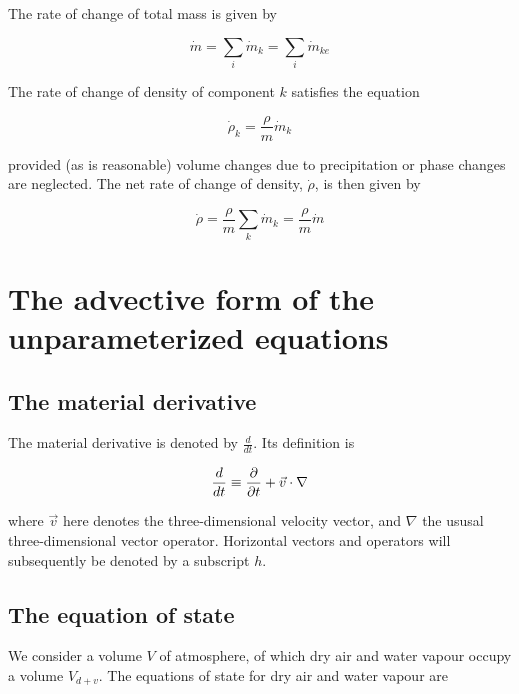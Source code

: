 The rate of change of total mass is given by

\begin{equation}
\label{A.1.5}\dot{m} = \sum_i  \dot{m}_k = \sum_i \dot{m}_{ke}
\end{equation}

The rate of change of density of component $k$ satisfies the equation

\begin{equation}
\label{A.1.6}\dot{\rho}_{k}=\frac{\rho}{m}{\dot{m}_{k}}
\end{equation}

provided (as is reasonable) volume changes due to precipitation or
phase changes are neglected. The net rate of change of density,
$\dot{\rho}$, is
then given by

\begin{equation}
\label{A.1.7}\dot{\rho}=\frac{\rho}{m}\sum_{k}\dot{m}_{k}=\frac{\rho}{m}\dot{m}
\end{equation}



\section{The advective form of the unparameterized equations}\label{sA.2}
\subsection{The material derivative}\label{suA.2.1}

The material derivative is denoted by $\frac{d}{dt}$.
Its definition is

\begin{equation}
\label{A.2.1.1}
\frac{d}{dt}\equiv \frac {\partial } {\partial t}+\vec{v} \cdot\nabla
\end{equation}

where $\vec{v}$ here denotes the three-dimensional velocity vector,
and $\nabla$ the ususal three-dimensional vector operator. Horizontal vectors
and operators will subsequently be denoted by a subscript $h$.

\subsection{The equation of state}\label{suA.2.2}

We consider a volume $V$ of atmosphere, of
which dry air and water vapour occupy a volume $V_{d+v}$. The equations of
state for dry air and water vapour are

